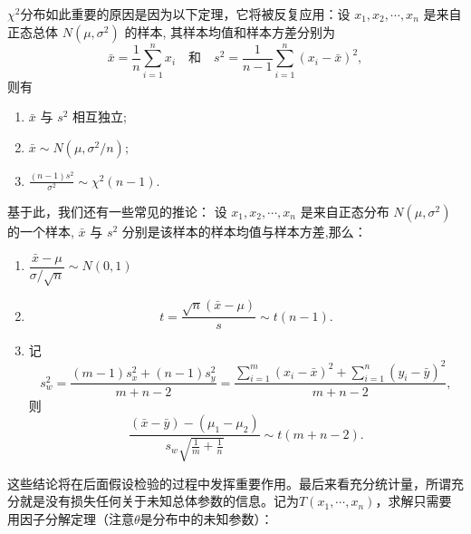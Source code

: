 \documentclass[a4paper]{ctexart}
\begin{document}
$\chi^2$分布如此重要的原因是因为以下定理，它将被反复应用：设 \(x_1, x_2, \cdots, x_n\) 是来自正态总体 \(N(\mu, \sigma^2)\) 的样本, 其样本均值和样本方差分别为
\[
\bar{x} = \frac{1}{n} \sum_{i=1}^n x_i \quad \text{和} \quad s^2 = \frac{1}{n-1} \sum_{i=1}^n (x_i - \bar{x})^2,
\]
则有
\begin{enumerate}
    \item[(1)] \(\bar{x}\) 与 \(s^2\) 相互独立;
    \item[(2)] \(\bar{x} \sim N(\mu, \sigma^2/n)\);
    \item[(3)] \(\displaystyle \frac{(n-1)s^2}{\sigma^2} \sim \chi^2(n-1)\).
\end{enumerate}
基于此，我们还有一些常见的推论：
设 \(x_1, x_2, \cdots, x_n\) 是来自正态分布 \(N(\mu, \sigma^2)\) 的一个样本, \(\bar{x}\) 与 \(s^2\) 分别是该样本的样本均值与样本方差,那么：
\begin{enumerate}
    \item $\dfrac{\bar{x} - \mu}{\sigma/\sqrt{n}} \sim N(0, 1)$
    \item \[
    t = \dfrac{\sqrt{n}(\bar{x} - \mu)}{s} \sim t(n-1). \tag{5.4.6}
    \]
    \item 记
    \[
    s_w^2 = \frac{(m-1)s_x^2 + (n-1)s_y^2}{m+n-2} = \frac{\sum_{i=1}^m (x_i - \bar{x})^2 + \sum_{i=1}^n (y_i - \bar{y})^2}{m+n-2},
    \]
    则
    \[
    \frac{(\bar{x} - \bar{y}) - (\mu_1 - \mu_2)}{s_w \sqrt{\frac{1}{m} + \frac{1}{n}}} \sim t(m+n-2). \tag{5.4.7}
    \]
\end{enumerate}
这些结论将在后面假设检验的过程中发挥重要作用。最后来看充分统计量，所谓充分就是没有损失任何关于未知总体参数的信息。记为$T(x_1,\cdots,x_n)$，求解只需要用因子分解定理（注意$\theta$是分布中的未知参数）：
\end{document}
